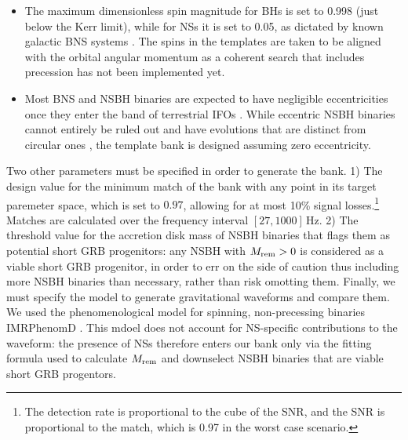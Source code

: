 \documentclass[binding=0.6cm, LaM]{sapthesis}
\begin{document}
\begin{itemize}
        \item The maximum dimensionless spin magnitude for BHs is set to 0.998 (just below the Kerr limit), while for NSs it is set to 0.05, as dictated by known galactic BNS systems \cite{97}.  The spins in the templates are taken to be aligned with the orbital angular momentum as a coherent search that includes precession has not been implemented yet.
        \item Most BNS and NSBH binaries
        are expected to have negligible eccentricities once they enter the band of terrestrial IFOs \cite{86}.
        While eccentric NSBH binaries cannot entirely be ruled out
        and have evolutions that are distinct from circular ones \cite{71},
        the template bank is designed assuming zero eccentricity.
      \end{itemize}

      Two other parameters must be specified in order to generate the bank.  
	1) The design value for the minimum match of the bank with any point in its target paremeter space, which is set to $0.97$, allowing for at most 10\% signal losses.\footnote{The detection rate is proportional to the cube of the SNR, and the SNR is proportional to the match, which is 0.97 in the worst case scenario.}  Matches are calculated over the frequency interval $[27, 1000]\,$Hz. 2) The threshold value for the accretion disk mass of NSBH binaries that flags them as potential short GRB progenitors: any NSBH with $M_{\rm rem}>0$ is considered as a viable short GRB progenitor, in order to err on the side of caution thus including more NSBH binaries than necessary, rather than risk omotting them.
      Finally, we must specify the model to generate gravitational waveforms and compare them.  We used the phenomenological model for spinning, non-precessing binaries {\ttfamily IMRPhenomD} \cite{106}.  This mdoel does not account for NS-specific contributions to the waveform: the presence of NSs therefore enters our bank only via the fitting formula used to calculate $M_{\rm rem}$ and downselect NSBH binaries that are viable short GRB progentors.
\end{document}
